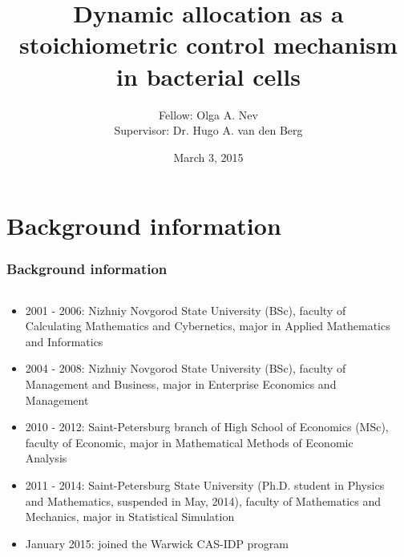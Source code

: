 \documentclass[handout]{beamer}
\begin{document}
\footnotesize

\title{Dynamic allocation as a stoichiometric control mechanism in bacterial cells}
\author{Fellow: Olga A. Nev\\Supervisor: Dr. Hugo A. van den Berg}
\date{March 3, 2015}

\begin{frame}
  \titlepage
\end{frame}

\section{Background information}

\begin{frame}
\frametitle{Background information}
\begin{minipage}[0.2\textheight]{\textwidth}
\begin{columns}[T]
\begin{column}{0.75\textwidth}
 \begin{itemize}
\item 2001 - 2006: Nizhniy Novgorod State University (BSc), faculty of Calculating Mathematics and Cybernetics, major in Applied Mathematics and Informatics\\
\item 2004 - 2008: Nizhniy Novgorod State University (BSc), faculty of Management and Business, major in Enterprise Economics and Management\\
\item 2010 - 2012: Saint-Petersburg branch of High School of Economics (MSc), faculty of Economic, major in Mathematical Methods of Economic Analysis\\
\item 2011 - 2014: Saint-Petersburg State University (Ph.D. student in Physics and Mathematics, suspended in May, 2014), faculty of Mathematics and Mechanics, major in Statistical Simulation\\
\item January 2015: joined the Warwick CAS-IDP program 
\end{itemize}
\end{column}
\begin{column}{0.25\textwidth}
\center{\texttt{[image: NN]}}
\center{\texttt{[image: W]}}
\end{column}
\end{columns}
\end{minipage}
\end{frame}
\end{document}
